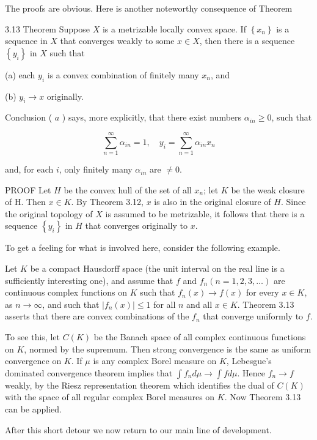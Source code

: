 \documentclass[10pt]{article}
\begin{document}
The proofs are obvious. Here is another noteworthy consequence of Theorem

3.13 Theorem Suppose $X$ is a metrizable locally convex space. If $\left\{x_{n}\right\}$ is a sequence in $X$ that converges weakly to some $x \in X$, then there is a sequence $\left\{y_{i}\right\}$ in $X$ such that

(a) each $y_{i}$ is a convex combination of finitely many $x_{n}$, and

(b) $y_{i} \rightarrow x$ originally.

Conclusion ( $a$ ) says, more explicitly, that there exist numbers $\alpha_{i n} \geq 0$, such that

$$
\sum_{n=1}^{\infty} \alpha_{i n}=1, \quad y_{i}=\sum_{n=1}^{\infty} \alpha_{i n} x_{n}
$$

and, for each $i$, only finitely many $\alpha_{i n}$ are $\neq 0$.

PROOF Let $H$ be the convex hull of the set of all $x_{n}$; let $K$ be the weak closure of H. Then $x \in K$. By Theorem 3.12, $x$ is also in the original closure of $H$. Since the original topology of $X$ is assumed to be metrizable, it follows that there is a sequence $\left\{y_{i}\right\}$ in $H$ that converges originally to $x$.

To get a feeling for what is involved here, consider the following example.

Let $K$ be a compact Hausdorff space (the unit interval on the real line is a sufficiently interesting one), and assume that $f$ and $f_{n}(n=1,2,3, \ldots)$ are continuous complex functions on $K$ such that $f_{n}(x) \rightarrow f(x)$ for every $x \in K$, as $n \rightarrow \infty$, and such that $\left|f_{n}(x)\right| \leq 1$ for all $n$ and all $x \in K$. Theorem 3.13 asserts that there are convex combinations of the $f_{n}$ that converge uniformly to $f$.

To see this, let $C(K)$ be the Banach space of all complex continuous functions on $K$, normed by the supremum. Then strong convergence is the same as uniform convergence on $K$. If $\mu$ is any complex Borel measure on $K$, Lebesgue's dominated
convergence theorem implies that $\int f_{n} d \mu \rightarrow \int f d \mu$. Hence $f_{n} \rightarrow f$ weakly, by the Riesz representation theorem which identifies the dual of $C(K)$ with the space of all regular complex Borel measures on $K$. Now Theorem 3.13 can be applied.

After this short detour we now return to our main line of development.
\end{document}
